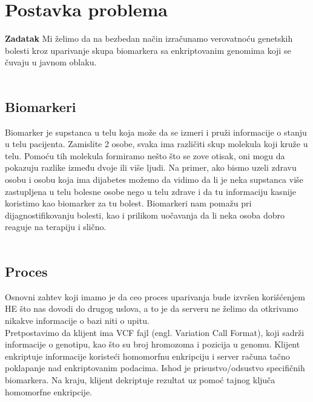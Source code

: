 \documentclass[a4paper]{article}
\begin{document}
\section{Postavka problema}
\textbf{Zadatak} Mi želimo da na bezbedan način izračunamo verovatnoću genetskih bolesti kroz uparivanje skupa biomarkera sa enkriptovanim genomima koji se čuvaju u javnom oblaku.\\\\
\subsection{Biomarkeri}
Biomarker je supstanca u telu koja može da se izmeri i pruži informacije o stanju u telu pacijenta. Zamislite 2 osobe, svaka ima različiti skup molekula koji kruže u telu. Pomoću tih molekula formiramo nešto što se zove otisak, oni mogu da pokazuju razlike između dvoje ili više ljudi. Na primer, ako bismo uzeli zdravu osobu i osobu koja ima dijabetes možemo da vidimo da li je neka supstanca više zastupljena u telu bolesne osobe nego u telu zdrave i da tu informaciju kasnije koristimo kao biomarker za tu bolest. Biomarkeri nam pomažu pri dijagnostifikovanju bolesti, kao i prilikom uočavanja da li neka osoba dobro reaguje na terapiju i slično.\\\\
\subsection{Proces}
Osnovni zahtev koji imamo je da ceo proces uparivanja bude izvršen korišćenjem HE što nas dovodi do drugog uslova, a to je da serveru ne želimo da otkrivamo nikakve informacije o bazi niti o upitu.\\
Pretpostavimo da klijent ima VCF fajl (engl. Variation Call Format), koji sadrži informacije o genotipu, kao što su broj hromozoma i pozicija u genomu. Klijent enkriptuje informacije koristeći homomorfnu enkripciju i server računa tačno poklapanje nad enkriptovanim podacima. Ishod je prisustvo/odsustvo specifičnih biomarkera. Na kraju, klijent dekriptuje rezultat uz pomoć tajnog ključa homomorfne enkripcije.
\end{document}
